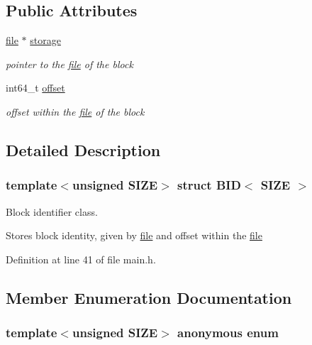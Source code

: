 \subsection*{Public Attributes}
\begin{CompactItemize}
\item 
\hypertarget{group__mnglayer_g3d4299dcb48a35d580cd2190645c62ac}{
\hyperlink{classfile}{file} $\ast$ \hyperlink{group__mnglayer_g3d4299dcb48a35d580cd2190645c62ac}{storage}}
\label{group__mnglayer_g3d4299dcb48a35d580cd2190645c62ac}

\begin{CompactList}\small\item\em pointer to the \hyperlink{classfile}{file} of the block \item\end{CompactList}\item 
\hypertarget{group__mnglayer_gaed8ae4d4226e9d51644054bd322f6fe}{
int64\_\-t \hyperlink{group__mnglayer_gaed8ae4d4226e9d51644054bd322f6fe}{offset}}
\label{group__mnglayer_gaed8ae4d4226e9d51644054bd322f6fe}

\begin{CompactList}\small\item\em offset within the \hyperlink{classfile}{file} of the block \item\end{CompactList}\end{CompactItemize}


\subsection{Detailed Description}
\subsubsection*{template$<$unsigned SIZE$>$ struct BID$<$ SIZE $>$}

Block identifier class. 

Stores block identity, given by \hyperlink{classfile}{file} and offset within the \hyperlink{classfile}{file} 

Definition at line 41 of file main.h.

\subsection{Member Enumeration Documentation}
\hypertarget{structBID_c0031771196a42b2015dff3c779daf71}{
\subsubsection[{"@1}]{\setlength{\rightskip}{0pt plus 5cm}template$<$unsigned SIZE$>$ anonymous enum}}
\label{structBID_c0031771196a42b2015dff3c779daf71}



